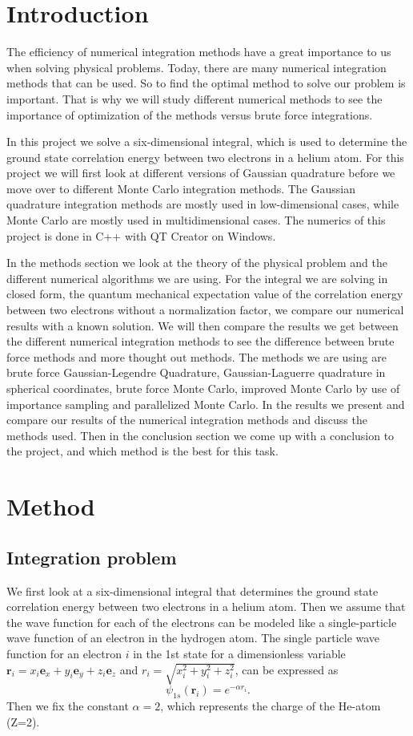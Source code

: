 \documentclass[12pt,a4paper,english]{article}
\begin{document}
\section{Introduction}
The efficiency of numerical integration methods have a great importance to us when solving physical problems. Today, there are many numerical integration methods that can be used. So to find the optimal method to solve our problem is important. That is why we will study different numerical methods to see the importance of optimization of the methods versus brute force integrations.

In this project we solve a six-dimensional integral, which is used to determine the ground state correlation energy between two electrons in a helium atom. For this project we will first look at different versions of Gaussian quadrature before we move over to different Monte Carlo integration methods. The Gaussian quadrature integration methods are mostly used in low-dimensional cases, while Monte Carlo are mostly used in multidimensional cases. The numerics of this project is done in C++ with QT Creator on Windows.

In the methods section we look at the theory of the physical problem and the different numerical algorithms we are using. For the integral we are solving in closed form, the quantum mechanical expectation value of the correlation energy between two electrons without a normalization factor, we compare our numerical results with a known solution. We will then compare the results we get between the different numerical integration methods to see the difference between brute force methods and more thought out methods. The methods we are using are brute force Gaussian-Legendre Quadrature, Gaussian-Laguerre quadrature in spherical coordinates, brute force Monte Carlo, improved Monte Carlo by use of importance sampling and parallelized Monte Carlo. In the results we present and compare our results of the numerical integration methods and discuss the methods used. Then in the conclusion section we come up with a conclusion to the project, and which method is the best for this task.

\section{Method}
\subsection{Integration problem}
We first look at a six-dimensional integral that determines the ground state correlation energy between two electrons in a helium atom. Then we assume that the wave function for each of the electrons can be modeled like a single-particle wave function of an electron in the hydrogen atom. The single particle wave function for an electron $i$ in the 1st state for a dimensionless variable $\textbf{r}_i=x_i\textbf{e}_x+y_i\textbf{e}_y+z_i\textbf{e}_z$ and $r_i=\sqrt{x_i^2+y_i^2+z_i^2}$, can be expressed as 
\begin{equation}
\label{eq:wave_func}
\psi_{1s}(\textbf{r}_i)=e^{-\alpha r_i}.
\end{equation}
Then we fix the constant $\alpha=2$, which represents the charge of the He-atom (Z=2). 
\end{document}
